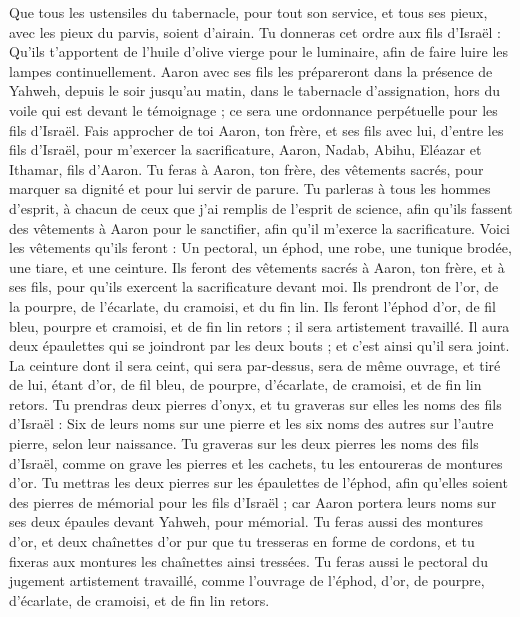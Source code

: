 \begin{multicols}{2}
Que tous les ustensiles du tabernacle, pour tout son service, et tous ses pieux, avec les pieux du parvis, soient d'airain\FTNT{}.
Tu donneras cet ordre aux fils d'Israël : Qu'ils t'apportent de l'huile d'olive vierge pour le luminaire, afin de faire luire les lampes continuellement\FTNT{}.
Aaron avec ses fils les prépareront dans la présence de Yahweh, depuis le soir jusqu'au matin, dans le tabernacle d'assignation, hors du voile qui est devant le témoignage ; ce sera une ordonnance perpétuelle pour les fils d'Israël.
\VerseOne{}Fais approcher de toi Aaron, ton frère, et ses fils avec lui, d'entre les fils d'Israël, pour m'exercer la sacrificature, Aaron, Nadab, Abihu, Eléazar et Ithamar, fils d'Aaron.
Tu feras à Aaron, ton frère, des vêtements sacrés, pour marquer sa dignité et pour lui servir de parure.
Tu parleras à tous les hommes d'esprit, à chacun de ceux que j'ai remplis de l'esprit de science, afin qu'ils fassent des vêtements à Aaron pour le sanctifier, afin qu'il m'exerce la sacrificature.
Voici les vêtements qu’ils feront : Un pectoral, un éphod, une robe, une tunique brodée, une tiare, et une ceinture. Ils feront des vêtements sacrés à Aaron, ton frère, et à ses fils, pour qu’ils exercent la sacrificature devant moi.
Ils prendront de l'or, de la pourpre, de l'écarlate, du cramoisi, et du fin lin.
Ils feront l’éphod d’or, de fil bleu, pourpre et cramoisi, et de fin lin retors ; il sera artistement travaillé.
Il aura deux épaulettes qui se joindront par les deux bouts ; et c’est ainsi qu’il sera joint.
La ceinture dont il sera ceint, qui sera par-dessus, sera de même ouvrage, et tiré de lui, étant d'or, de fil bleu, de pourpre, d'écarlate, de cramoisi, et de fin lin retors.
Tu prendras deux pierres d'onyx, et tu graveras sur elles les noms des fils d'Israël :
Six de leurs noms sur une pierre et les six noms des autres sur l'autre pierre, selon leur naissance.
Tu graveras sur les deux pierres les noms des fils d’Israël, comme on grave les pierres et les cachets, tu les entoureras de montures d’or.
Tu mettras les deux pierres sur les épaulettes de l'éphod, afin qu'elles soient des pierres de mémorial pour les fils d'Israël ; car Aaron portera leurs noms sur ses deux épaules devant Yahweh, pour mémorial.
Tu feras aussi des montures d'or,
et deux chaînettes d’or pur que tu tresseras en forme de cordons, et tu fixeras aux montures les chaînettes ainsi tressées.
Tu feras aussi le pectoral du jugement artistement travaillé, comme l'ouvrage de l'éphod, d'or, de pourpre, d'écarlate, de cramoisi, et de fin lin retors.

\end{multicols}
